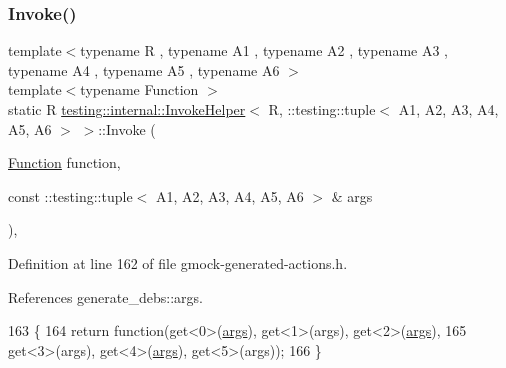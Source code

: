 \subsubsection{\texorpdfstring{Invoke()}{Invoke()}}
{\footnotesize\ttfamily template$<$typename R , typename A1 , typename A2 , typename A3 , typename A4 , typename A5 , typename A6 $>$ \\
template$<$typename Function $>$ \\
static R \hyperlink{classtesting_1_1internal_1_1InvokeHelper}{testing\+::internal\+::\+Invoke\+Helper}$<$ R, \+::testing\+::tuple$<$ A1, A2, A3, A4, A5, A6 $>$ $>$\+::Invoke (\begin{DoxyParamCaption}\item[{\hyperlink{structtesting_1_1internal_1_1Function}{Function}}]{function,  }\item[{const \+::testing\+::tuple$<$ A1, A2, A3, A4, A5, A6 $>$ \&}]{args }\end{DoxyParamCaption})\hspace{0.3cm}{\ttfamily [inline]}, {\ttfamily [static]}}



Definition at line 162 of file gmock-\/generated-\/actions.\+h.



References generate\+\_\+debs\+::args.


\begin{DoxyCode}
163                  \{
164            \textcolor{keywordflow}{return} \textcolor{keyword}{function}(get<0>(\hyperlink{namespacegenerate__debs_a75f9143e38df82d83b2e8a6f99cae02c}{args}), get<1>(args), get<2>(\hyperlink{namespacegenerate__debs_a75f9143e38df82d83b2e8a6f99cae02c}{args}),
165                get<3>(args), get<4>(\hyperlink{namespacegenerate__debs_a75f9143e38df82d83b2e8a6f99cae02c}{args}), get<5>(args));
166   \}
\end{DoxyCode}
\mbox{\label{classtesting_1_1internal_1_1InvokeHelper_3_01R_00_01_1_1testing_1_1tuple_3_01A1_00_01A2_00_01A3_129338555c00c55487bfe9fa59e479ab_aecdf0f71f5b2c0441b066f62e936805e}} 
